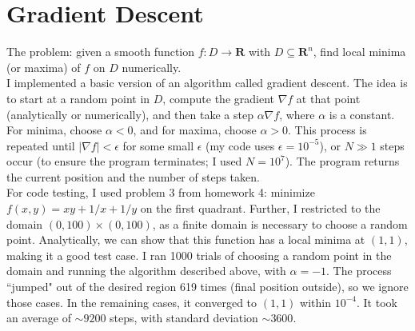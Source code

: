 \documentclass[11pt]{article}
\theoremstyle{plain}
\begin{document}
\section{Gradient Descent}
The problem: given a smooth function $f:D\to\mathbf{R}$ with $D\subseteq\mathbf{R}^n$, find local minima (or maxima) of $f$ on $D$ numerically. \\
\indent I implemented a basic version of an algorithm called gradient descent. The idea is to start at a random point in $D$, compute the gradient $\nabla f$ at that point (analytically or numerically), and then take a step $\alpha \nabla f$, where $\alpha$ is a constant. For minima, choose $\alpha<0$, and for maxima, choose $\alpha>0$. This process is repeated until $|\nabla f|<\epsilon$ for some small $\epsilon$ (my code uses $\epsilon = 10^{-5}$), or $N\gg1$ steps occur (to ensure the program terminates; I used $N=10^7$). The program returns the current position and the number of steps taken. \\
\indent For code testing, I used problem 3 from homework 4: minimize $f(x,y) = xy + 1/x + 1/y$ on the first quadrant. Further, I restricted to the domain $(0,100)\times(0,100)$, as a finite domain is necessary to choose a random point. Analytically, we can show that this function has a local minima at $(1,1)$, making it a good test case. I ran 1000 trials of choosing a random point in the domain and running the algorithm described above, with $\alpha = -1$. The process ``jumped" out of the desired region 619 times (final position outside), so we ignore those cases. In the remaining cases, it converged to $(1,1)$ within $10^{-4}$. It took an average of $\sim 9200$ steps, with standard deviation $\sim 3600$.
\end{document}
